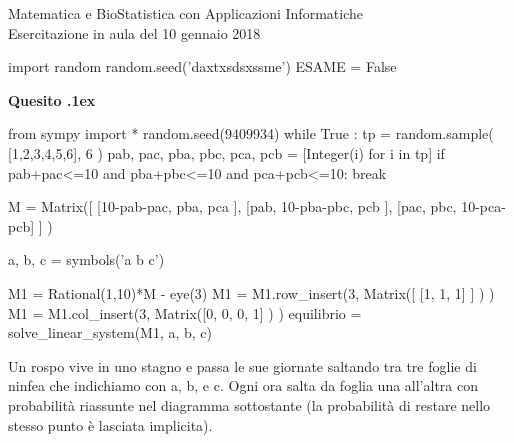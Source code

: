 \documentclass[11pt,twoside,a4paper]{article}
\newcounter{quesito}
\newenvironment{question}{\addtocounter{quesito}{1}\par\textbf{Quesito \thequesito.\kern1ex}}{\vspace{0.5\parskip}}
\begin{document}
\colorbox{blue!10}{\begin{minipage}{\textwidth}
Matematica e BioStatistica con Applicazioni Informatiche\\
Esercitazione in aula del 10 gennaio 2018
\end{minipage}}



\begin{pycode}
import random
random.seed('daxtxsdsxssme')
ESAME = False
\end{pycode}

    
\begin{question}
\def\Pr{{\rm Pr\,}}
\def\pyl#1{\py{latex(#1) } }
\everymath{\displaystyle}
\def\nicefrac#1#2{#1/#2}
\renewcommand{\arraystretch}{1.3}
\begin{pycode}
from sympy import *
random.seed(9409934)
while True :
    tp  =  random.sample( [1,2,3,4,5,6], 6 ) 
    pab, pac, pba, pbc, pca, pcb = [Integer(i) for i in tp] 
    if pab+pac<=10 and pba+pbc<=10 and pca+pcb<=10: break
    
M = Matrix([  [10-pab-pac, pba,        pca       ],
              [pab,         10-pba-pbc, pcb      ],
              [pac,         pbc,        10-pca-pcb] ] )
    
a, b, c = symbols('a b c')

M1 = Rational(1,10)*M - eye(3)
M1 = M1.row_insert(3, Matrix([ [1, 1, 1] ] ) )
M1 = M1.col_insert(3, Matrix([0, 0, 0, 1] ) )
equilibrio = solve_linear_system(M1, a, b, c)

\end{pycode}
Un rospo vive in uno stagno e passa le sue giornate saltando tra tre foglie di ninfea 
che indichiamo con {\sf a}, {\sf b}, e {\sf c}. Ogni ora salta da foglia una all'altra 
con probabilità riassunte nel diagramma sottostante (la probabilità di restare nello 
stesso punto è lasciata implicita). 

\hfil
{}


\end{question}
\end{document}
